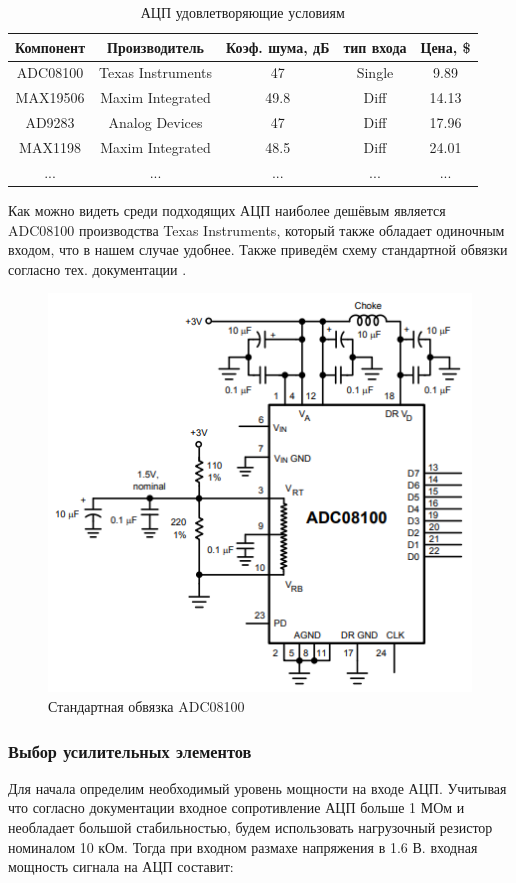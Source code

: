 \documentclass[utf8x, 14pt, oneside, a4paper]{article}
\begin{document}
				\begin{table}[H]	
					\centering
					\begin{tabular}{|c|c|c|c|c|}
						\hline
						Компонент & Производитель & Коэф. шума, дБ & тип входа & Цена, \$ \\
						\hline
						ADC08100 & Texas Instruments & 47 & Single & 9.89 \\
						\hline
						MAX19506 & Maxim Integrated & 49.8 & Diff & 14.13 \\
						\hline
						AD9283 & Analog Devices & 47 & Diff & 17.96 \\
						\hline
						MAX1198 &  Maxim Integrated & 48.5 & Diff & 24.01 \\
						\hline
						... & ... & ... & ... & ... \\
						\hline
					\end{tabular}
					\caption{АЦП удовлетворяющие условиям}
					\label{table:ADC}
				\end{table}
				
				Как можно видеть среди подходящих АЦП наиболее дешёвым является ADC08100 производства Texas Instruments, который также обладает одиночным входом, что в нашем случае удобнее. Также приведём схему стандартной обвязки согласно тех. документации \cite{bib:docs:ADC08100}.
				
				\begin{figure}[H]
					\centering
					\includegraphics[width=0.7\linewidth]{"Рисунки/Доки/ADC08100"}
					\caption{Стандартная обвязка ADC08100}
					\label{fig:doc:ADC08100}
				\end{figure}
			
			\subsubsection{Выбор усилительных элементов}
				Для начала определим необходимый уровень мощности на входе АЦП. Учитывая что согласно документации \cite{bib:docs:ADC08100} входное сопротивление АЦП больше 1 МОм и необладает большой стабильностью, будем использовать нагрузочный резистор номиналом 10 кОм. Тогда при входном размахе напряжения в 1.6 В. входная мощность сигнала на АЦП составит:
				
\end{document}
